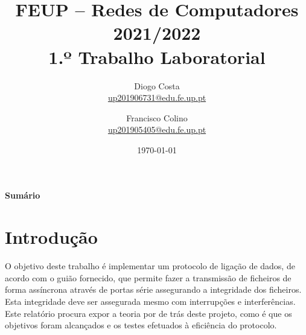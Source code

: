 \documentclass[a4paper,11pt,portuguese]{article}
\begin{document}

\author{
    Diogo Costa\\
    \href{mailto:up201906731@edu.fe.up.pt}{up201906731@edu.fe.up.pt}
    \and
    Francisco Colino\\
    \href{mailto:up201905405@edu.fe.up.pt}{up201905405@edu.fe.up.pt}
}
\title{FEUP -- Redes de Computadores \large 2021/2022 \\ \large 1.º Trabalho Laboratorial}
\date{\today}
\maketitle

\begin{center}
    \textbf{Sumário}
\end{center}



\section{Introdução}

    O objetivo deste trabalho é implementar um protocolo de ligação de dados, 
    de acordo com o guião fornecido, que permite fazer a transmissão de ficheiros 
    de forma assíncrona através de portas série assegurando a integridade dos ficheiros.
    Esta integridade deve ser assegurada mesmo com interrupções e interferências. 
    Este relatório procura expor a teoria por de trás deste projeto, como é que os
    objetivos foram alcançados e os testes efetuados à eficiência do protocolo. \par
\end{document}
